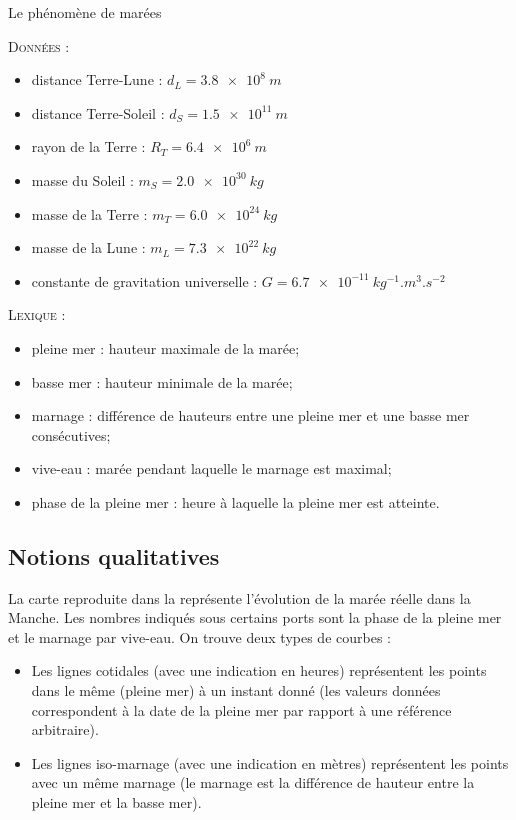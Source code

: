 

\begin{exo}[PC][1][devoir]{Le phénomène de marées}

  \textsc{Données} :
  \normalsize

  \begin{itemize}
  \item distance Terre-Lune : $d_L=\SI{3.8e8}{m}$
  \item distance Terre-Soleil : $d_S=\SI{1.5e11}{m}$
  \item rayon de la Terre : $R_T=\SI{6.4e6}{m}$
  \item masse du Soleil : $m_S=\SI{2.0e30}{kg}$
  \item masse de la Terre : $m_T=\SI{6.0e24}{kg}$
  \item masse de la Lune : $m_L=\SI{7.3e22}{kg}$
  \item constante de gravitation universelle : $G=\SI{6.7e-11}{kg^{-1}.m^{3}.s^{-2}}$\\
  \end{itemize}

  \textsc{Lexique} :
  \normalsize
  \begin{itemize}
  \item pleine mer : hauteur maximale de la marée;
  \item basse mer : hauteur minimale de la marée;
  \item marnage : différence de hauteurs entre une pleine mer et une basse mer consécutives;
  \item vive-eau : marée pendant laquelle le marnage est maximal;
  \item phase de la pleine mer : heure à laquelle la pleine mer est atteinte.
  \end{itemize}

  \subsection{Notions qualitatives}
  La carte reproduite dans la  représente l'évolution de la marée réelle dans la Manche. Les nombres indiqués sous certains ports sont la phase de la pleine mer et le marnage par vive-eau.
  On trouve deux types de courbes :
  \begin{itemize}
  \item Les lignes cotidales (avec une indication en heures) représentent les points dans le même  (pleine mer) à un instant donné (les valeurs données correspondent à la date de la pleine mer par rapport à une référence arbitraire).
  \item Les lignes iso-marnage (avec une indication en mètres) représentent les points avec un même marnage (le marnage est la différence de hauteur entre la pleine mer et la basse mer).\\
  \end{itemize}


\end{exo}
